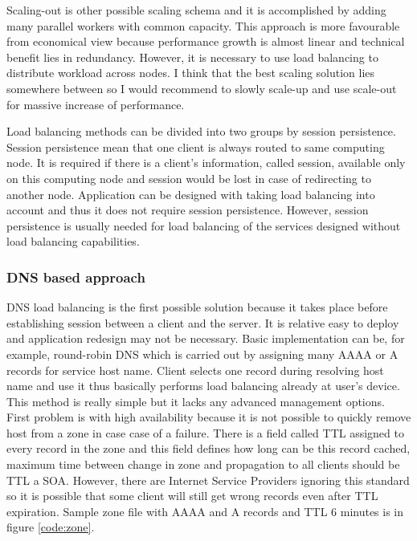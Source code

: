 Scaling-out is other possible scaling schema and it is accomplished by adding many parallel workers with common capacity. This approach is more favourable from economical view because performance growth is almost linear and technical benefit lies in redundancy. However, it is necessary to use load balancing to distribute workload across nodes. I think that the best scaling solution lies somewhere between so I would recommend to slowly scale-up and use scale-out for massive increase of performance.

Load balancing methods can be divided into two groups by session persistence. Session persistence mean that one client is always routed to same computing node. It is required if there is a client's information, called session, available only on this computing node and session would be lost in case of redirecting to another node. Application can be designed with taking load balancing into account and thus it does not require session persistence. However, session persistence is usually needed for load balancing of the services designed without load balancing capabilities.

\subsubsection{DNS based approach}
\Ac{DNS} load balancing is the first possible solution because it takes place before establishing session between a client and the server. It is relative easy to deploy and application redesign may not be necessary. Basic implementation can be, for example, round-robin \Ac{DNS} which is carried out by assigning many AAAA or A records for service host name. Client selects one record during resolving host name and use it thus basically performs load balancing already at user's device. This method is really simple but it lacks any advanced management options. First problem is with high availability because it is not possible to quickly remove host from a zone in case case of a failure. There is a field called \Ac{TTL} assigned to every record in the zone and this field defines how long can be this record cached, maximum time between change in zone and propagation to all clients should be \Ac{TTL} a \Ac{SOA}. However, there are Internet Service Providers ignoring this standard so it is possible that some client will still get wrong records even after \Ac{TTL} expiration. Sample zone file with AAAA and A records and \Ac{TTL} 6 minutes is in figure \ref{code:zone}.

